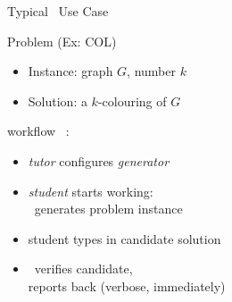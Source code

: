 \begin{slide}{Typical \autotool\ Use Case}

Problem (Ex: COL)
\begin{itemize}\itemsep 2pt
\item Instance:  graph $G$, number $k$
\item Solution: a $k$-colouring of $G$
\end{itemize}

workflow \autotool\ :
\begin{itemize}\itemsep 2pt
\item \emph{tutor} configures \emph{generator} 
\item \emph{student} starts working:  \\
  \autotool\ generates problem instance
\item student types in candidate solution
\item \autotool\ verifies candidate, \\
  reports back (verbose, immediately)
\end{itemize}

\end{slide}

